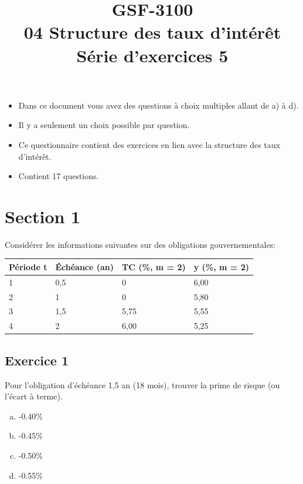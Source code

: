 \documentclass[10pt,a4paper]{article}
\title{GSF-3100 \\
04 Structure des taux d'intérêt \\
Série d'exercices 5}
\begin{document}
\maketitle

\begin{itemize}
\item Dans ce document vous avez des questions à choix multiples allant de a) à d).  
\item Il y a seulement un choix possible par question.
\item Ce questionnaire contient des exercices en lien avec la structure des taux d'intérêt.
\item Contient 17 questions. 
\end{itemize}
 
\newpage

\section*{Section 1}
Considérer les informations suivantes sur des obligations gouvernementales:


\begin{table}[H]
\begin{center}
\begin{tabular}{|l|l|l|l|}
\hline
Période t & Échéance (an) & TC (\%, m = 2) & y (\%, m = 2) \\ \hline
1         & 0,5           & 0              & 6,00          \\ \hline
2         & 1             & 0              & 5,80          \\ \hline
3         & 1,5           & 5,75           & 5,55          \\ \hline
4         & 2             & 6,00           & 5,25          \\ \hline
\end{tabular}
\end{center}
\end{table}



\subsection*{Exercice 1}
Pour l'obligation d'échéance 1,5 an (18 mois),  trouver la prime de risque (ou l’écart à terme).


\begin{enumerate}[a)]
\item -0.40\%
\item -0.45\%
\item -0.50\%
\item -0.55\%
\end{enumerate}
\end{document}
